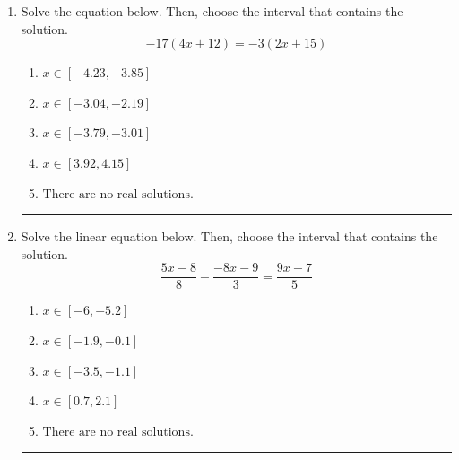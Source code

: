 \documentclass[14pt]{extbook}
\newcommand{\litem}[1]{\item#1\hspace*{-1cm}\rule{\textwidth}{0.4pt}}
\begin{document}
\begin{enumerate}
\litem{
Solve the equation below. Then, choose the interval that contains the solution.\[ -17(4x + 12) = -3(2x + 15) \]\begin{enumerate}[label=\Alph*.]
\item \( x \in [-4.23, -3.85] \)
\item \( x \in [-3.04, -2.19] \)
\item \( x \in [-3.79, -3.01] \)
\item \( x \in [3.92, 4.15] \)
\item \( \text{There are no real solutions.} \)

\end{enumerate} }
\litem{
Solve the linear equation below. Then, choose the interval that contains the solution.\[ \frac{5x -8}{8} - \frac{-8x -9}{3} = \frac{9x -7}{5} \]\begin{enumerate}[label=\Alph*.]
\item \( x \in [-6, -5.2] \)
\item \( x \in [-1.9, -0.1] \)
\item \( x \in [-3.5, -1.1] \)
\item \( x \in [0.7, 2.1] \)
\item \( \text{There are no real solutions.} \)


\end{enumerate}}
\end{enumerate}
\end{document}
